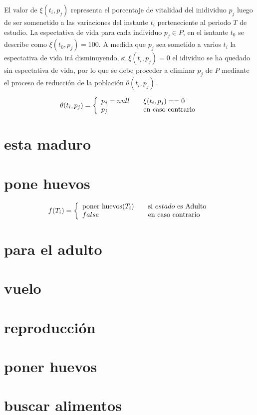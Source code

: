 El valor de $\xi (t_{i}, p_{j})$ representa el porcentaje de vitalidad del
inidividuo $p_{j}$ luego de ser somenetido a las variaciones del instante
$t_{i}$ perteneciente al periodo $T$ de estudio. La espectativa de vida
para cada individuo $p_{j} \in P$, en el isntante $t_{0}$ se describe como
$\xi (t_{0}, p_{j})= 100$. A medida que $p_{j}$ sea sometido a varios
$t_{i}$ la espectativa de vida irá disminuyendo, si $\xi (t_{i}, p_{j})= 0$ el
idividuo se ha quedado sin espectativa de vida, por lo que se debe proceder
a eliminar $p_{j}$ de $P$ mediante el proceso de reducción de la población
$\theta (t_{i}, p_{j})$.

\begin{equation}
\theta (t_{i}, p_{j}) = \left\{
  \begin{array}{l l}
    p_{j} = null & \quad \xi(t_{i}, p_{j}) == 0 \\
    p_{j} & \quad \text{en caso contrario}
  \end{array} \right.
\end{equation}


\section{esta maduro}
\section{pone huevos}
\begin{equation}
f(T_{i}) = \left\{
  \begin{array}{l l}
    \text{poner huevos}(T_{i}) & \quad \text{si $estado$ es  Adulto}\\
    false & \quad \text{en caso contrario}
  \end{array} \right.
\end{equation}

\section{para el adulto}
\section{vuelo}
\section{reproducción}
\section{poner huevos}
\section{buscar alimentos}
